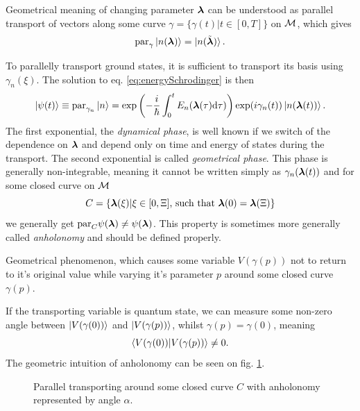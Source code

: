 Geometrical meaning of changing parameter ${\bm\lambda}$ can be understood as parallel transport of vectors along some curve $\gamma=\{\gamma(t)| t\in[0,T]\}$ on $\mathcal{M}$, which gives
\begin{equation}
    \textrm{par}_\gamma \ket{n({\bm\lambda})} = \ket{n(\tilde {{\bm\lambda}})}.
\end{equation}



To parallelly transport ground states, it is sufficient to transport its basis using $\gamma_n(\xi)$. The solution to eq. \ref{eq:energySchrodinger} is then
\begin{equation}
    \ket{\psi(t)} \equiv \textrm{par}_{\gamma_n}\ket{n} = \exp\left(-\frac{i}{\hbar}\int_0^tE_n({\bm\lambda}(\tau)\mathrm{d}\tau)\right)\exp(i\gamma_n(t))\ket{n({\bm\lambda}(t))}.
    \label{eq:phasesOnManifold}
\end{equation}
The first exponential, the \emph{dynamical phase}, is well known if we switch of the dependence on ${\bm\lambda}$ and depend only on time and energy of states during the transport. The second exponential is called \emph{geometrical phase}. This phase is generally non-integrable, meaning it cannot be written simply as $\gamma_n({\bm\lambda}(t))$ and for some closed curve on $\mathcal{M}$
\begin{equation}
    C=\{{\bm\lambda}(\xi)|\xi\in[0,\Xi] \text{, such that }{\bm\lambda}(0)={\bm\lambda}(\Xi)\}
\end{equation} 
we generally get $\textrm{par}_C \psi({\bm\lambda})\neq \psi({\bm\lambda})$. This property is sometimes more generally called \emph{anholonomy} and should be defined properly.
\begin{definition}[Anholonomy]
    Geometrical phenomenon, which causes some variable $V(\gamma(p))$ not to return to it's original value while varying it's parameter $p$ around some closed curve $\gamma(p)$. 
\end{definition}
If the transporting variable is quantum state, we can measure some non-zero angle between $\ket{V(\gamma(0))}$ and $\ket{V(\gamma(p))}$, whilst $\gamma(p)=\gamma(0)$, meaning
$$\braket{V(\gamma(0))|V(\gamma(p))}\neq 0.$$ 
The geometric intuition of anholonomy can be seen on fig. \ref{fig:parallelTransportClosed}.

\begin{figure}[h]
    \centering
\caption{Parallel transporting around some closed curve $C$ with anholonomy represented by angle $\alpha$.}
    \label{fig:parallelTransportClosed}
\end{figure}

